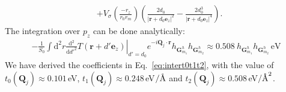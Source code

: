 \documentclass[aps,prx,10pt,twocolumn,superscriptaddress]{revtex4}
\def\angstrom{\mbox{\normalfont\AA}}
\def\angstrom{\mbox{\normalfont\AA}}
\begin{document}
\begin{widetext}
\begin{equation}
\begin{split}
&+V_{\sigma}\left(\frac{-r_{z}}{r_{0}r_{m}}\right)\left(\frac{2d_{0}}{\left|\textbf{r}+d_{0}\textbf{e}_{z}\right|^{2}}-\frac{2d^{3}_{0}}{\left|\textbf{r}+d_{0}\textbf{e}_{z}\right|^{4}}\right).
\end{split}
\end{equation}
The integration over $p_z$ can be done analytically:
\begin{equation}
\begin{split}
-\frac{1}{S_{0}}\int\mathrm{d}^{2}r\left.\frac{\mathrm{d}^{2}}{\mathrm{d}d'^{2}}T(\textbf{r}+d'\textbf{e}_{z})\right|_{d'=d_{0}}e^{-i\textbf{Q}_{j}\cdot\textbf{r}}h_{\textbf{G}^{h}_{m_{1}}}h_{\textbf{G}^{h}_{m_{2}}}\approx0.508\ h_{\textbf{G}^{h}_{m_{1}}}h_{\textbf{G}^{h}_{m_{2}}}\,\textrm{eV}
\end{split}
\end{equation}
We have derived the coefficients in Eq.~\ref{eq:intert0t1t2}, with the value of $t_{0}(\textbf{Q}_{j})\!\approx\!0.101\,$eV, $t_{1}(\textbf{Q}_{j})\!\approx\!0.248\,$eV$/\angstrom$ and $t_{2}(\textbf{Q}_{j})\!\approx\!0.508\,$eV$/\angstrom^{2}$.


\end{widetext}
\end{document}
